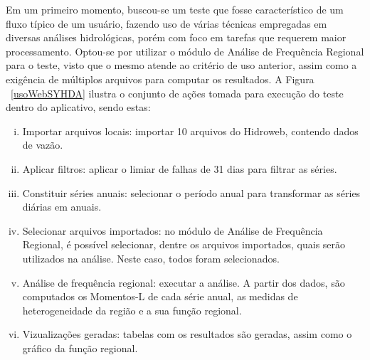 \documentclass[12pt,english,brazil]{article}
\begin{document}
Em um primeiro momento, buscou-se um teste que fosse característico de um fluxo típico de um usuário, fazendo uso de várias técnicas empregadas em diversas análises hidrológicas, porém com foco em tarefas que requerem maior processamento. Optou-se por utilizar o módulo de Análise de Frequência Regional para o teste, visto que o mesmo atende ao critério de uso anterior, assim como a exigência de múltiplos arquivos para computar os resultados. A Figura ~\ref{usoWebSYHDA} ilustra o conjunto de ações tomada para execução do teste dentro do aplicativo, sendo estas:


\begin{enumerate}[i.]
  \item Importar arquivos locais: importar 10 arquivos do Hidroweb, contendo dados de vazão.
  \item Aplicar filtros: aplicar o limiar de falhas de 31 dias para filtrar as séries.
  \item Constituir séries anuais: selecionar o período anual para transformar as séries diárias em anuais.
  \item Selecionar arquivos importados: no módulo de Análise de Frequência Regional, é possível selecionar, dentre os arquivos importados, quais serão utilizados na análise. Neste caso, todos foram selecionados.
  \item Análise de frequência regional: executar a análise. A partir dos dados, são computados os Momentos-L de cada série anual, as medidas de heterogeneidade da região e a sua função regional.
  \item Vizualizações geradas: tabelas com os resultados são geradas, assim como o gráfico da função regional.
\end{enumerate}
\end{document}
